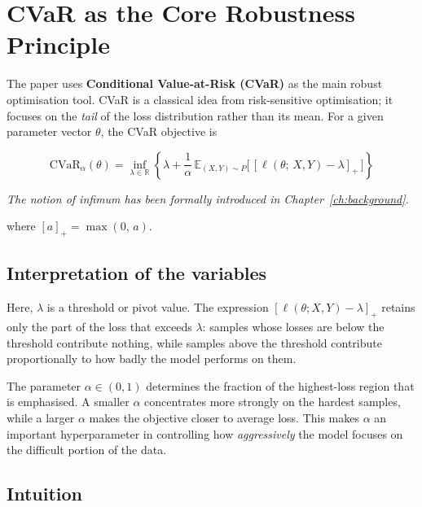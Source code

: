 \section{CVaR as the Core Robustness Principle}
\label{sec:cvar_core}

The paper \cite{dag_paper} uses \textbf{Conditional Value-at-Risk (CVaR)} as the main robust optimisation tool. CVaR is a classical idea from risk-sensitive optimisation; it focuses on the \emph{tail} of the loss distribution rather than its mean. For a given parameter vector $\theta$, the CVaR objective is

\begin{equation}
    \mathrm{CVaR}_{\alpha}(\theta)
    = \inf_{\lambda \in \mathbb{R}}
      \left\{
        \lambda
        + \frac{1}{\alpha}\,
          \mathbb{E}_{(X,Y)\sim P}
          \bigl[\,[\ell(\theta;\,X,Y) - \lambda]_{+}\,\bigr]
      \right\}
    \label{eq:cvar}
\end{equation}

\textit{The notion of infimum has been formally introduced in Chapter~\ref{ch:background}.}


\noindent where $[a]_{+} = \max(0,\,a)$.

\subsection{Interpretation of the variables}
\label{subsec:cvar_vars}

Here, $\lambda$ is a threshold or pivot value. The expression $[\ell(\theta;X,Y)-\lambda]_{+}$ retains only the part of the loss that exceeds $\lambda$: samples whose losses are below the threshold contribute nothing, while samples above the threshold contribute proportionally to how badly the model performs on them.

The parameter $\alpha \in (0,1)$ determines the fraction of the highest-loss region that is emphasised. A smaller $\alpha$ concentrates more strongly on the hardest samples, while a larger $\alpha$ makes the objective closer to average loss. This makes $\alpha$ an important hyperparameter in controlling how \emph{aggressively} the model focuses on the difficult portion of the data.

\subsection{Intuition}
\label{subsec:cvar_intuition}

